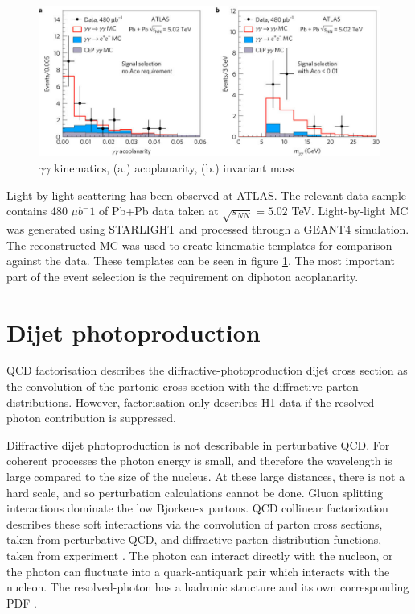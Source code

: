 \begin{figure}[]
\begin{centering}
\includegraphics[width=7in]{Chapter2/importfigs/nphys4208-f3.jpg}
\par\end{centering}
\caption{$\gamma \gamma$ kinematics, (a.) acoplanarity, (b.) invariant mass \cite{Aaboud:2017bwk} \label{fig:ggKin}}
\end{figure}

Light-by-light scattering has been observed at ATLAS. The relevant data sample contains 480 $\mu b^-1$ of Pb+Pb data taken at $\sqrt{s_{NN}}=5.02$ TeV. Light-by-light MC was generated using STARLIGHT and processed through a GEANT4 simulation. The reconstructed MC was used to create kinematic templates for comparison against the data. These templates can be seen in figure \ref{fig:ggKin}. The most important part of the event selection is the requirement on diphoton acoplanarity. 

\section{Dijet photoproduction}

QCD factorisation describes the diffractive-photoproduction dijet cross section as the convolution of the partonic cross-section with the diffractive parton distributions. However, factorisation only describes H1 data if the resolved photon contribution is suppressed. 

Diffractive dijet photoproduction is not describable in perturbative QCD. For coherent processes the photon energy is small, and therefore the wavelength is large compared to the size of the nucleus. At these large distances, there is not a hard scale, and so perturbation calculations cannot be done. Gluon splitting interactions dominate the low Bjorken-x partons. QCD collinear factorization describes these soft interactions via the convolution of parton cross sections, taken from perturbative QCD, and diffractive parton distribution functions, taken from experiment \cite{Andreev:2015cwa,Chekanov:2008fh}. The photon can interact directly with the nucleon, or the photon can fluctuate into a quark-antiquark pair which interacts with the nucleon. The resolved-photon has a hadronic structure and its own corresponding PDF \cite{Bauer:1977iq}.

